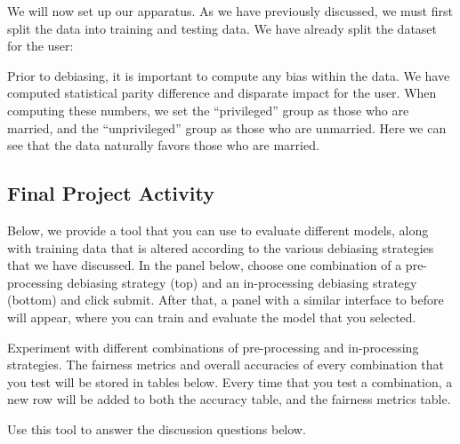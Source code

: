 \par We will now set up our apparatus. As we have previously discussed, we must first split the data into training and testing data. We have already split the dataset for the user:
\begin{VCSet}
    \begin{visualComponent}
    \end{visualComponent} 

\par Prior to debiasing, it is important to compute any bias within the data. We have computed statistical parity difference and disparate impact for the user. When computing these numbers, we set the “privileged” group as those who are married, and the “unprivileged” group as those who are unmarried. Here we can see that the data naturally favors those who are married.

\begin{visualComponent}
\end{visualComponent}

\subsection{Final Project Activity}
\par Below, we provide a tool that you can use to evaluate different models, along with training data that is altered according to the various debiasing strategies that we have discussed. In the panel below, choose one combination of a pre-processing debiasing strategy (top) and an in-processing debiasing strategy (bottom) and click submit. After that, a panel with a similar interface to before will appear, where you can train and evaluate the model that you selected.
\par Experiment with different combinations of pre-processing and in-processing strategies. The fairness metrics and overall accuracies of every combination that you test will be stored in tables below. Every time that you test a combination, a new row will be added to both the accuracy table, and the fairness metrics table.
\par Use this tool to answer the discussion questions below.
\begin{visualComponent}
\end{visualComponent}

\begin{visualComponent}
\end{visualComponent}


\end{VCSet}
